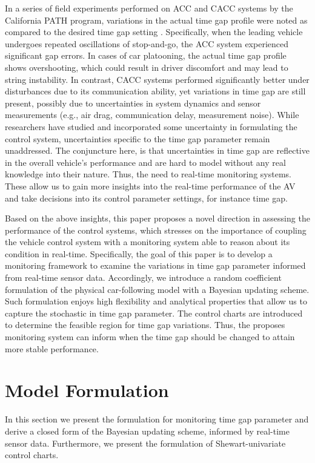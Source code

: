 \documentclass{article}
\begin{document}
In a series of field experiments performed on ACC and CACC systems by the California PATH program, variations in the actual time gap profile were noted as compared to the desired time gap setting \cite{shladover2009effects}. Specifically, when the leading vehicle undergoes repeated oscillations of stop-and-go, the ACC system experienced significant gap errors. In cases of car platooning, the actual time gap profile shows overshooting, which could result in driver discomfort and may lead to string instability. In contrast, CACC systems performed significantly better under disturbances due to its communication ability, yet variations in time gap are still present, possibly due to uncertainties in system dynamics and sensor measurements (e.g., air drag, communication delay, measurement noise). While researchers have studied and incorporated some uncertainty in formulating the control system, uncertainties specific to the time gap parameter remain unaddressed. The conjuncture here, is that uncertainties in time gap are reflective in the overall vehicle's performance and are hard to model without any real knowledge into their nature. Thus, the need to real-time monitoring systems. These allow us to gain more insights into the real-time performance of the AV and take decisions into its control parameter settings, for instance time gap. 

Based on the above insights, this paper proposes a novel direction in assessing the performance of the control systems, which stresses on the importance of coupling the vehicle control system with a monitoring system able to reason about its condition in real-time. Specifically, the goal of this paper is to develop a monitoring framework to examine the variations in time gap parameter informed from real-time sensor data. Accordingly, we introduce a random coefficient formulation of the physical car-following model with a Bayesian updating scheme. Such formulation enjoys high flexibility and analytical properties that allow us to capture the stochastic in time gap parameter. The control charts are introduced to determine the feasible region for time gap variations. Thus, the proposes monitoring system can inform when the time gap should be changed to attain more stable performance. 


\section{Model Formulation}
\label{sec:2}
In this section we present the formulation for monitoring time gap parameter and derive a closed form of the Bayesian updating scheme, informed by real-time sensor data. Furthermore, we present the formulation of Shewart-univariate control charts. 
\end{document}
